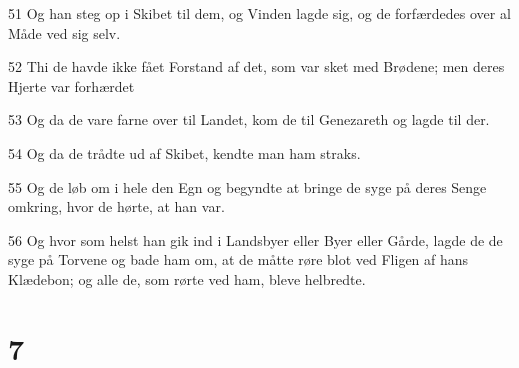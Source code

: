 \par 51 Og han steg op i Skibet til dem, og Vinden lagde sig, og de forfærdedes over al Måde ved sig selv.
\par 52 Thi de havde ikke fået Forstand af det, som var sket med Brødene; men deres Hjerte var forhærdet
\par 53 Og da de vare farne over til Landet, kom de til Genezareth og lagde til der.
\par 54 Og da de trådte ud af Skibet, kendte man ham straks.
\par 55 Og de løb om i hele den Egn og begyndte at bringe de syge på deres Senge omkring, hvor de hørte, at han var.
\par 56 Og hvor som helst han gik ind i Landsbyer eller Byer eller Gårde, lagde de de syge på Torvene og bade ham om, at de måtte røre blot ved Fligen af hans Klædebon; og alle de, som rørte ved ham, bleve helbredte.

\chapter{7}

